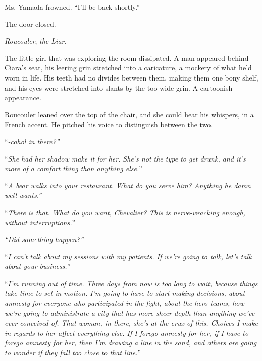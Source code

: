 Ms. Yamada frowned.  ``I'll be back shortly.''



The door closed.



\emph{Roucouler}, \emph{the Liar.}



The little girl that was exploring the room dissipated.  A man appeared behind Ciara's seat, his leering grin stretched into a caricature, a mockery of what he'd worn in life.  His teeth had no divides between them, making them one bony shelf, and his eyes were stretched into slants by the too-wide grin.  A cartoonish appearance.



Roucouler leaned over the top of the chair, and she could hear his whispers, in a French accent.  He pitched his voice to distinguish between the two.



``\emph{-cohol in there?''}



``\emph{She had her shadow make it for her.  She's not the type to get drunk, and it's more of a comfort thing than anything else.}''



``\emph{A bear walks into your restaurant.  What do you serve him?  Anything he damn well wants.''}



``\emph{There is that.  What do you want, Chevalier?  This is nerve-wracking enough, without interruptions.}''



\emph{``Did something happen?''}



``\emph{I can't talk about my sessions with my patients.  If we're going to talk, let's talk about your business.}''



``\emph{I'm running out of time.  Three days from now is too long to wait, because things take time to set in motion.  I'm going to have to start making decisions, about amnesty for everyone who participated in the fight, about the hero teams, how we're going to administrate a city that has more sheer depth than anything we've ever conceived of.  That woman, in there, she's at the crux of this.  Choices I make in regards to her affect everything else.  If I forego amnesty for her, if I have to forego amnesty for her, then I'm drawing a line in the sand, and others are going to wonder if they fall too close to that line.}''



